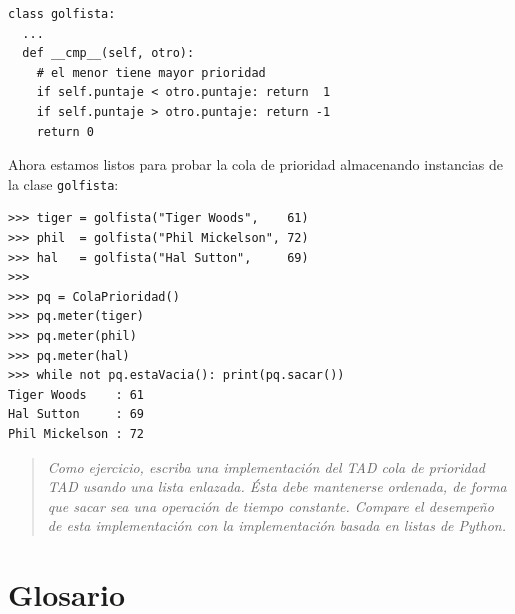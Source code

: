 \beforeverb 
\begin{verbatim}
class golfista:
  ...
  def __cmp__(self, otro):
    # el menor tiene mayor prioridad
    if self.puntaje < otro.puntaje: return  1   
    if self.puntaje > otro.puntaje: return -1
    return 0
\end{verbatim}
\afterverb Ahora estamos listos para probar la cola de prioridad
almacenando instancias de la clase \texttt{golfista}:

\beforeverb 
\begin{verbatim}
>>> tiger = golfista("Tiger Woods",    61)
>>> phil  = golfista("Phil Mickelson", 72)
>>> hal   = golfista("Hal Sutton",     69)
>>>
>>> pq = ColaPrioridad()
>>> pq.meter(tiger)
>>> pq.meter(phil)
>>> pq.meter(hal)
>>> while not pq.estaVacia(): print(pq.sacar())
Tiger Woods    : 61
Hal Sutton     : 69
Phil Mickelson : 72
\end{verbatim}
\afterverb
\begin{quote}
{\em Como ejercicio, escriba una implementación del TAD cola de
prioridad TAD usando una lista enlazada. Ésta debe mantenerse ordenada,
de forma que sacar sea una operación de tiempo constante. Compare
el desempeño de esta implementación con la implementación basada en
listas de Python.} 
\end{quote}

\section{Glosario}

